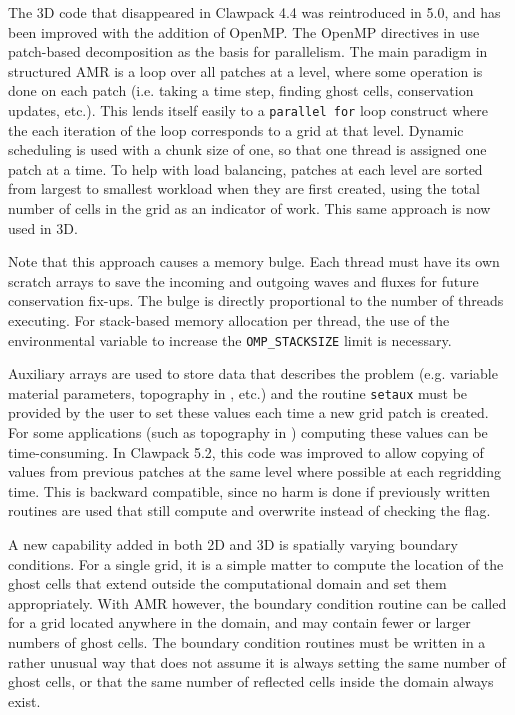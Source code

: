 The 3D \amrclaw code that disappeared in Clawpack 4.4 was reintroduced in
5.0, and has been improved with the addition of OpenMP.
The OpenMP directives in \amrclaw use 
patch-based decomposition as the basis for
parallelism. The main paradigm in structured AMR is a loop over
all patches at a level, where some operation is done on each patch
(i.e. taking a time step, finding ghost cells, conservation
updates, etc.). This lends itself easily to a {\tt parallel for} loop
construct where the each iteration of the loop corresponds to a
grid at that level. Dynamic scheduling is used with a chunk size
of one, so that one thread is assigned one patch at a time. 
To help with load balancing, patches at
each level are sorted from largest to smallest workload when they
are first created, using
the total number of cells in the grid as an indicator of work.
This same approach is now used in 3D.  

Note that this approach causes a memory bulge. Each thread
must have its own scratch arrays to save the incoming and
outgoing waves and fluxes for future conservation fix-ups. 
The bulge is directly proportional to the number
of threads executing. For stack-based memory allocation per
thread, the use of the environmental variable to increase the
{\tt OMP\_STACKSIZE} limit is necessary.


Auxiliary arrays are used to store data that describes the problem (e.g.
variable material parameters, topography in \geoclaw, etc.) and the routine
\texttt{setaux} must be provided by the user to set these values each time a
new grid patch is created.  For some applications (such as topography in
\geoclaw) computing these values can be time-consuming.  In Clawpack 5.2,
this code was improved to allow copying of values from previous patches at
the same level where possible at each regridding time. 
This is backward compatible, since no harm is done if previously
written routines are used that still compute and overwrite instead of
checking the flag.  

A new capability added in both 2D and 3D is spatially varying
boundary conditions.  
For a single grid, it is a simple matter to
compute the location of the ghost cells that extend
outside the computational domain and set them appropriately.
With AMR however, the boundary condition routine can be called
for a grid located anywhere in the domain, and may contain fewer
or larger numbers of ghost cells. The boundary condition routines
must be written in a rather unusual way that does not assume it
is always setting the same number of ghost cells, or that the
same number of reflected cells inside the domain always exist.



